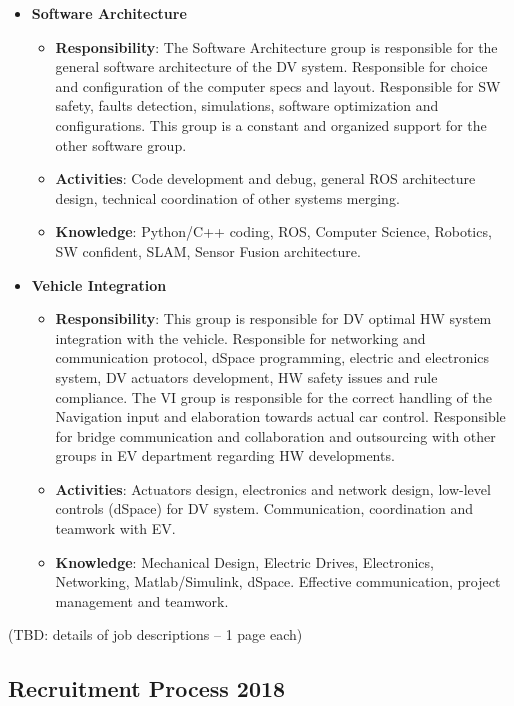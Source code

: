\documentclass[graybox]{svmult}
\begin{document}
\begin{itemize}
	\item \textbf{Software Architecture}
    \begin{itemize}
		\item \textbf{Responsibility}: The Software Architecture group is responsible for the general software architecture of the DV system. Responsible for choice and configuration of the computer specs and layout. Responsible for SW safety, faults detection, simulations, software optimization and configurations. This group is a constant and organized support for the other software group.
		\item \textbf{Activities}: Code development and debug, general ROS architecture design, technical coordination of other systems merging.
		\item \textbf{Knowledge}: Python/C++ coding, ROS, Computer Science, Robotics, SW confident, SLAM, Sensor Fusion architecture.
	\end{itemize}

	\item \textbf{Vehicle Integration}
	\begin{itemize}
		\item \textbf{Responsibility}: This group is responsible for DV optimal HW system integration   with the vehicle. Responsible for networking and communication protocol, dSpace programming, electric and electronics system, DV actuators development, HW safety issues and rule compliance. The VI group is responsible for the correct handling of the Navigation input and elaboration towards actual car control. Responsible for bridge communication and collaboration and outsourcing with other groups in EV department regarding HW developments. 
		\item \textbf{Activities}: Actuators design, electronics and network design, low-level controls (dSpace) for DV system. Communication, coordination and teamwork with EV.
		\item \textbf{Knowledge}: Mechanical Design, Electric Drives, Electronics, Networking, Matlab/Simulink, dSpace. Effective communication, project management and teamwork.
	\end{itemize}
\end{itemize}

(TBD: details of job descriptions – 1 page each)

\subsection{Recruitment Process 2018}
\end{document}
